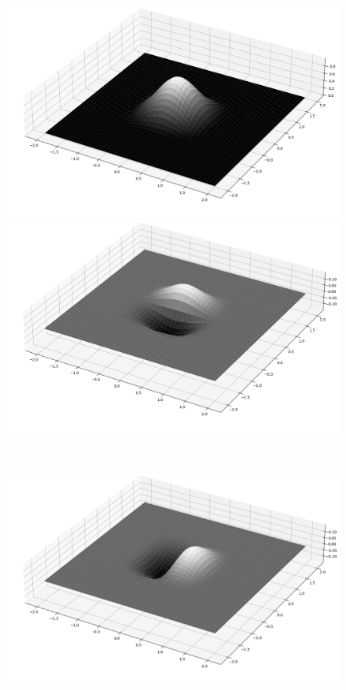 \documentclass[fleqn, bachelor,subf,12pt,notitlepage]{article}
\begin{document}
\begin{figure}[H]
  \centering
  \begin{minipage}[b]{0.45\textwidth}
    \includegraphics[width=\textwidth]{images/two_dimensional_ermite_1}
  \end{minipage}
  \hfill
  \begin{minipage}[b]{0.45\textwidth}
    \includegraphics[width=\textwidth]{images/two_dimensional_ermite_2}
  \end{minipage}
\\
  \begin{minipage}[b]{0.45\textwidth}
    \includegraphics[width=\textwidth]{images/two_dimensional_ermite_3}

\end{minipage}
\end{figure}
\end{document}
